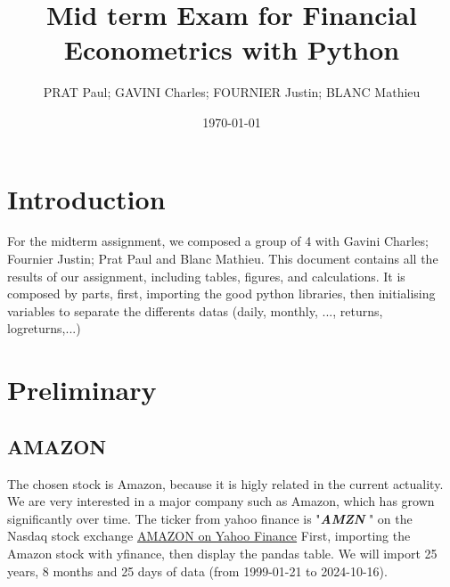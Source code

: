 \documentclass{article}
\begin{document}
\title{Mid term Exam for Financial Econometrics with Python}
\author{PRAT Paul; GAVINI Charles; FOURNIER Justin; BLANC Mathieu}
\date{\today}

\maketitle %

\tableofcontents %

\section{Introduction}
For the midterm assignment, we composed a group of 4 with Gavini Charles; Fournier Justin; Prat Paul and Blanc Mathieu. 
This document contains all the results of our assignment, including tables, figures, and calculations. 
It is composed by  parts, first, importing the good python libraries,
then initialising variables to separate the differents datas (daily, monthly, ..., returns, logreturns,...)


\section{Preliminary}


\subsection{AMAZON}

The chosen stock is Amazon, because it is higly related in the current actuality. We are very interested in a major company such as Amazon, which has grown significantly over time.
The ticker from yahoo finance is "\textbf{\textit{AMZN}} " on the Nasdaq stock exchange \href{https://finance.yahoo.com/quote/AMZN/.}{AMAZON on Yahoo Finance}
First, importing the Amazon stock with yfinance, then display the pandas table.
We will import 25 years, 8 months and 25 days of data (from 1999-01-21 to 2024-10-16).
\end{document}
